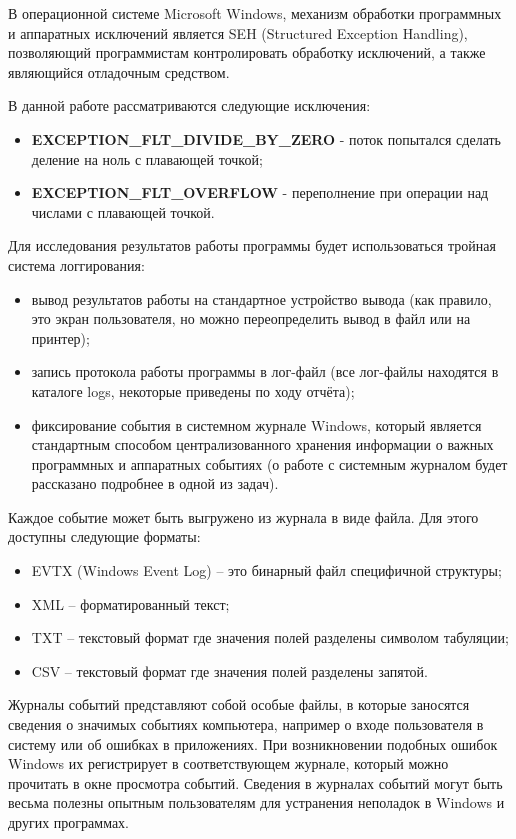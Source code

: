 \documentclass[a4paper, 12pt]{report}		%
\begin{document}
В операционной системе Microsoft Windows, механизм обработки программных и аппаратных исключений является SEH (Structured Exception Handling), позволяющий программистам контролировать обработку исключений, а также являющийся отладочным средством\cite{Dushutina}.

\vspace{1em}
В данной работе рассматриваются следующие исключения:
\begin{itemize}
\item \textbf{EXCEPTION\_FLT\_DIVIDE\_BY\_ZERO} - поток попытался сделать деление на ноль с плавающей точкой;
\item \textbf{EXCEPTION\_FLT\_OVERFLOW} - переполнение при операции над числами с плавающей точкой.
\end{itemize}

Для исследования результатов работы программы будет использоваться тройная система логгирования:
\begin{itemize}
\item вывод результатов работы на стандартное устройство вывода (как правило, это экран пользователя, но можно переопределить вывод в файл или на принтер);
\item запись протокола работы программы в лог-файл (все лог-файлы находятся в каталоге logs, некоторые приведены по ходу отчёта);
\item фиксирование события в системном журнале Windows, который является стандартным способом централизованного хранения информации о важных программных и аппаратных событиях (о работе с системным журналом будет рассказано подробнее в одной из задач).
\end{itemize}

Каждое событие может быть выгружено из журнала в виде файла. Для этого доступны следующие форматы:
\begin{itemize}
\item EVTX (Windows Event Log) -- это бинарный файл специфичной структуры;
\item XML -- форматированный текст;
\item TXT -- текстовый формат где значения полей разделены символом табуляции;
\item CSV -- текстовый формат где значения полей разделены запятой.
\end{itemize}

Журналы событий представляют собой особые файлы, в которые заносятся сведения о значимых событиях компьютера, например о входе пользователя в систему или об ошибках в приложениях\cite{MSDN1}. При возникновении подобных ошибок Windows их регистрирует в соответствующем журнале, который можно прочитать в окне просмотра событий. Сведения в журналах событий могут быть весьма полезны опытным пользователям для устранения неполадок в Windows и других программах.
\end{document}
